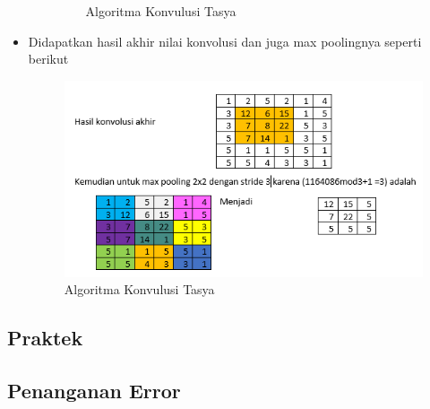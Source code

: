 \begin{itemize}
\begin{itemize}
\begin{figure}[ht]
\caption{Algoritma Konvulusi Tasya}
\label{Teori}
\end{figure}
\end{itemize}
\item Didapatkan hasil akhir nilai konvolusi dan juga max poolingnya seperti berikut
\begin{figure}[ht]
\centering
\includegraphics[scale=0.5]{figures/Chapter 7/1164086/Teori/chapter7tasya13.png}
\caption{Algoritma Konvulusi Tasya}
\label{Teori}
\end{figure}
\end{itemize}



\subsection{Praktek}


\subsection{Penanganan Error}
